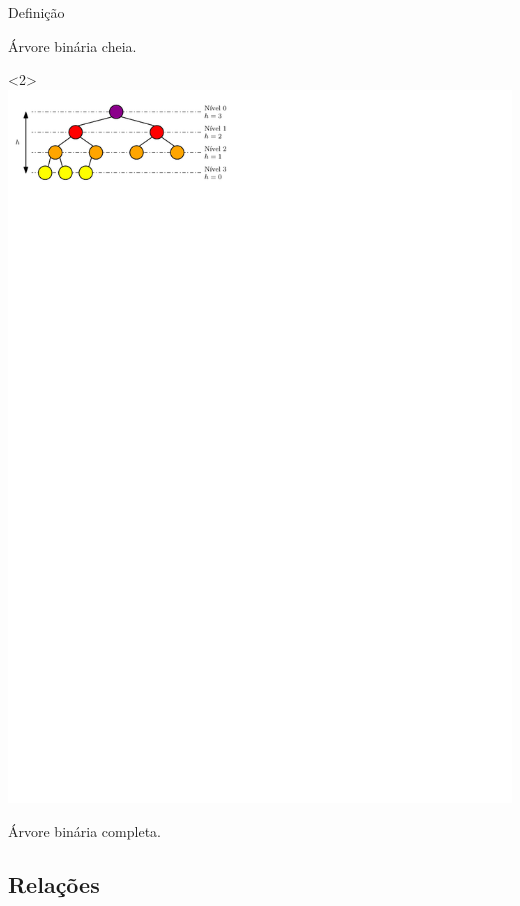 \documentclass[t, 10pt]{beamer}
\begin{document}
\begin{frame}{Definição}
\begin{center}
\begin{onlyenv}
        {\footnotesize
          Árvore binária cheia.
        }
      \end{onlyenv}
      \begin{onlyenv}<2>
        \includegraphics[]{img/img33.pdf}

        {\footnotesize
          Árvore binária completa.
        }
      \end{onlyenv}
    \end{center}
  \end{frame}

  \subsection{Relações}
\end{document}
